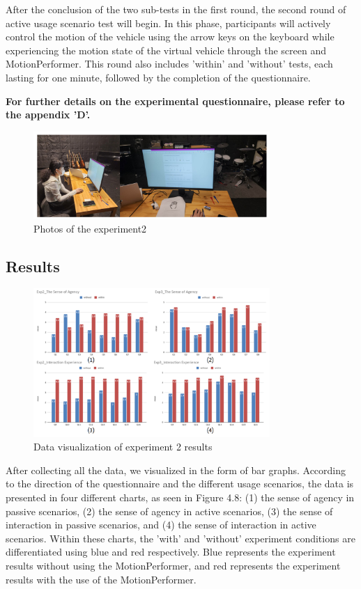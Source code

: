After the conclusion of the two sub-tests in the first round, the second round of active usage scenario test will begin. In this phase, participants will actively control the motion of the vehicle using the arrow keys on the keyboard while experiencing the motion state of the virtual vehicle through the screen and MotionPerformer. This round also includes 'within' and 'without' tests, each lasting for one minute, followed by the completion of the questionnaire.

\textbf{For further details on the experimental questionnaire, please refer to the appendix 'D'.}

\begin{figure}[h]
\centering
\includegraphics[width=0.8\textwidth]{A_thesis/figures/018.png}
\caption{Photos of the experiment2}
\end{figure}

\subsection{Results}
\begin{figure}[h]
\centering
\includegraphics[width=0.8\textwidth]{A_thesis/figures/043.png}
\caption{Data visualization of experiment 2 results}
\end{figure}

After collecting all the data, we visualized in the form of bar graphs. According to the direction of the questionnaire and the different usage scenarios, the data is presented in four different charts, as seen in Figure 4.8: (1) the sense of agency in passive scenarios, (2) the sense of agency in active scenarios, (3) the sense of interaction in passive scenarios, and (4) the sense of interaction in active scenarios. Within these charts, the 'with' and 'without' experiment conditions are differentiated using blue and red respectively. Blue represents the experiment results without using the MotionPerformer, and red represents the experiment results with the use of the MotionPerformer.

